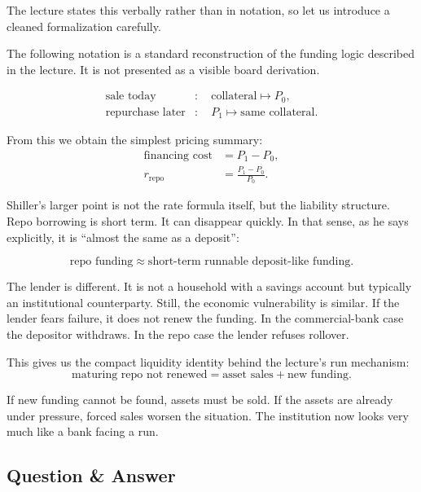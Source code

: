 The lecture states this verbally rather than in notation, so let us introduce a cleaned formalization carefully.

\begin{remark}
The following notation is a standard reconstruction of the funding logic described in the lecture. It is not presented as a visible board derivation.
\end{remark}

\begin{align}
\text{sale today} &:\quad \text{collateral} \mapsto P_0, \\
\text{repurchase later} &:\quad P_1 \mapsto \text{same collateral}.
\end{align}

From this we obtain the simplest pricing summary:
\begin{align}
\text{financing cost} &= P_1-P_0, \\
r_{\text{repo}} &= \frac{P_1-P_0}{P_0}.
\end{align}

Shiller's larger point is not the rate formula itself, but the liability structure. Repo borrowing is short term. It can disappear quickly. In that sense, as he says explicitly, it is ``almost the same as a deposit'':

\begin{equation}
\text{repo funding} \approx \text{short-term runnable deposit-like funding}.
\end{equation}

The lender is different. It is not a household with a savings account but typically an institutional counterparty. Still, the economic vulnerability is similar. If the lender fears failure, it does not renew the funding. In the commercial-bank case the depositor withdraws. In the repo case the lender refuses rollover.

This gives us the compact liquidity identity behind the lecture's run mechanism:
\begin{equation}
\text{maturing repo not renewed}=\text{asset sales}+\text{new funding}.
\end{equation}

If new funding cannot be found, assets must be sold. If the assets are already under pressure, forced sales worsen the situation. The institution now looks very much like a bank facing a run.

\subsection{Question \& Answer}

